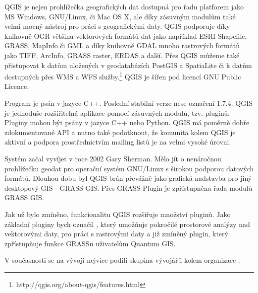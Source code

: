 QGIS je nejen prohlížečka geografických dat dostupná pro řadu platforem jako MS Windows, GNU/Linux, či Mac OS X, ale díky zásuvným modulům také velmi mocný nástroj pro práci s geografickými daty. QGIS podporuje díky knihovně OGR většinu vektorových formátů dat jako například ESRI Shapefile, GRASS, MapInfo či GML a díky knihovně  GDAL mnoho rastrových formátů jako TIFF, ArcInfo, GRASS raster, ERDAS a další. Přes QGIS můžeme také přistupovat k datům uložených v geodatabázích PostGIS a SpatiaLite či k datům dostupných přes WMS a WFS služby.\footnote{http://qgis.org/about-qgis/features.html} QGIS je šířen pod licencí GNU Public Licence.

Program je psán v jazyce C++. Poslední stabilní verze nese označení 1.7.4. QGIS je jednoduše rozšířitelná aplikace pomocí zásuvných modulů, tzv. pluginů. Pluginy mohou být psány v jazyce C++ nebo Python. QGIS má poměrně dobře zdokumentované API a nutno také podotknout, že komunita kolem QGIS je aktivní a podpora prostřednictvím mailing listů je na velmi vysoké úrovni.

Systém začal vyvíjet v roce 2002 Gary Sherman. Mělo jít o nenáročnou prohlížečku geodat pro operační systém GNU/Linux s širokou podporou datových formátů. Dlouhou dobu byl QGIS brán převážně jako grafická nadstavba pro jiný desktopový GIS - GRASS GIS. Přes GRASS Plugin je zpřístupněna řada modulů GRASS GIS. 

Jak už bylo zmíněno, funkcionalitu QGIS rozšiřuje množství pluginů. Jako základní pluginy bych označil  , který umožňuje pokročilé prostorové analýzy nad vektorovými daty,   pro práci s rastrovými daty a již zmíněný   plugin, který zpřístupňuje funkce GRASSu uživatelům Quantum GIS. 

V současnosti se na vývoji nejvíce podílí skupina vývojářů kolem organizace .

